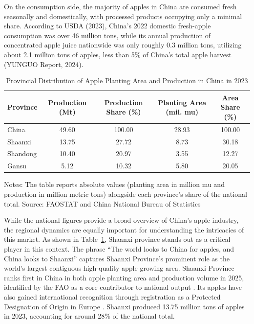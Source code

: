 On the consumption side, the majority of apples in China are consumed fresh seasonally and domestically, with processed products occupying only a minimal share. According to USDA (2023), China's 2022 domestic fresh-apple consumption was over 46 million tons, while its annual production of concentrated apple juice nationwide was only roughly 0.3 million tons, utilizing about 2.1 million tons of apples, less than 5\% of China's total apple harvest (YUNGUO Report, 2024).


\begin{table}[htbp]
\centering
\caption{Provincial Distribution of Apple Planting Area and Production in China in 2023}
\label{tab: production provinces}
\begin{threeparttable}
\begin{tabular}{lcccc}
\toprule
Province &
Production (Mt) &
Production Share (\%) &
Planting Area (mil. mu) &
Area Share (\%) \\
\midrule
China      & 49.60 & 100.00 & 28.93 & 100.00 \\
Shaanxi    & 13.75 & 27.72  & 8.73  & 30.18 \\
Shandong   & 10.40 & 20.97  & 3.55  & 12.27 \\
Gansu      & 5.12  & 10.32  & 5.80  & 20.05 \\
\bottomrule
\end{tabular}
\begin{tablenotes}
\footnotesize
\item Notes: The table reports absolute values (planting area in million mu and production in million metric tons) alongside each province's share of the national total. Source: FAOSTAT and China National Bureau of Statistics
\end{tablenotes}
\end{threeparttable}
\end{table}


While the national figures provide a broad overview of China's apple industry, the regional dynamics are equally important for understanding the intricacies of this market. As shown in Table~\ref{tab: production provinces}, Shaanxi province stands out as a critical player in this context. The phrase ``The world looks to China for apples, and China looks to Shaanxi'' captures Shaanxi Province's prominent role as the world's largest contiguous high-quality apple growing area. Shaanxi Province ranks first in China in both apple planting area and production volume in 2025, identified by the FAO as a core contributor to national output \citep{FAO2004}. Its apples have also gained international recognition through registration as a Protected Designation of Origin in Europe \citep{UKGov2021}. Shaanxi produced 13.75 million tons of apples in 2023, accounting for around 28\% of the national total.

